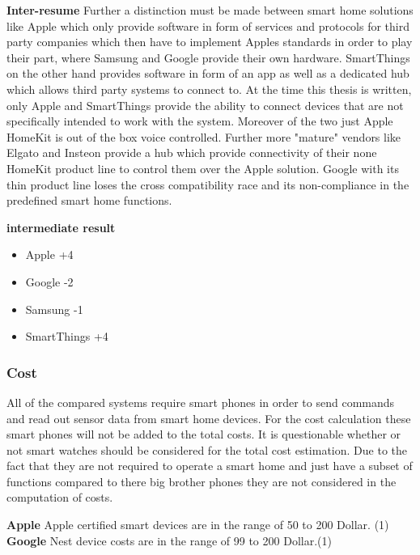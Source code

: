 			\textbf{Inter-resume}
				Further a distinction must be made between smart home solutions like Apple which only provide software in form of services and protocols for third party companies which then have to implement Apples standards in order to play their part, where Samsung and Google provide their own hardware. SmartThings on the other hand provides software in form of an app as well as a dedicated hub which allows third party systems to connect to. At the time this thesis is written, only Apple and SmartThings provide the ability to connect devices that are not specifically intended to work with the system. Moreover of the two just Apple HomeKit is out of the box voice controlled. Further more "mature" vendors like Elgato and Insteon provide a hub which provide connectivity of their none HomeKit product line to control them over the Apple solution. Google with its thin product line loses the cross compatibility race and its non-compliance in the predefined smart home functions.

				\textbf{intermediate result}
					\begin{itemize}
						\item Apple 		+4
						\item Google		-2
						\item Samsung 		-1
						\item SmartThings 	+4
					\end{itemize}



		\subsubsection{Cost}
			All of the compared systems require smart phones in order to send commands and read out sensor data from smart home devices. For the cost calculation these smart phones will not be added to the total costs. It is questionable whether or not smart watches should be considered for the total cost estimation. Due to the fact that they are not required to operate a smart home and just have a subset of functions compared to there big brother phones they are not considered in the computation of costs. 

			\textbf{Apple}
				Apple certified smart devices are in the range of 50 to 200 Dollar. (1)\\

			\textbf{Google}
				Nest device costs are in the range of 99 to 200 Dollar.(1)\\

